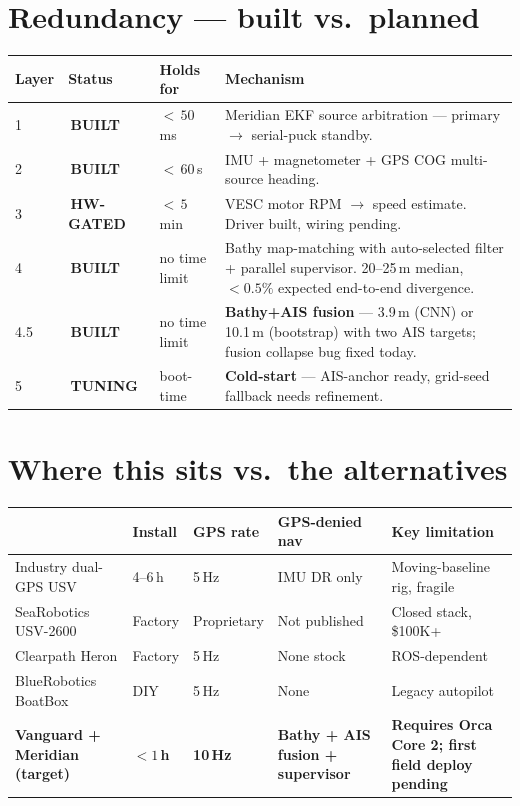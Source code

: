 \documentclass[10pt,a4paper]{article}
\newcommand{\statusbuilt}{{\color{white}\colorbox{mSafe}{\small\bfseries\,BUILT\,}}}
\newcommand{\statustuning}{{\color{white}\colorbox{mWarn}{\small\bfseries\,TUNING\,}}}
\newcommand{\statushardware}{{\color{white}\colorbox{mDim}{\small\bfseries\,HW-GATED\,}}}
\begin{document}
\pagebreak

\section{Redundancy — built vs.\ planned}
\begin{tabularx}{\textwidth}{@{}l l l X@{}}
\toprule
\textbf{Layer} & \textbf{Status} & \textbf{Holds for} & \textbf{Mechanism} \\
\midrule
\rowcolor{mRow} 1 & \statusbuilt & ${<}\,50$\,ms & Meridian EKF source arbitration — primary $\to$ serial-puck standby. \\
2 & \statusbuilt & ${<}\,60$\,s & IMU + magnetometer + GPS COG multi-source heading. \\
\rowcolor{mRow} 3 & \statushardware & ${<}\,5$\,min & VESC motor RPM $\to$ speed estimate. Driver built, wiring pending. \\
4 & \statusbuilt & no time limit & Bathy map-matching with auto-selected filter + parallel supervisor. 20--25\,m median, $<0.5\%$ expected end-to-end divergence. \\
\rowcolor{mRow} 4.5 & \statusbuilt & no time limit & \textbf{Bathy+AIS fusion} — 3.9\,m (CNN) or 10.1\,m (bootstrap) with two AIS targets; fusion collapse bug fixed today. \\
5 & \statustuning & boot-time & \textbf{Cold-start} — AIS-anchor ready, grid-seed fallback needs refinement. \\
\bottomrule
\end{tabularx}

\section{Where this sits vs.\ the alternatives}
\begin{tabularx}{\textwidth}{@{}L{38mm} l l l X@{}}
\toprule
\textbf{} & \textbf{Install} & \textbf{GPS rate} & \textbf{GPS-denied nav} & \textbf{Key limitation} \\
\midrule
{} Industry dual-GPS USV & 4--6\,h & 5\,Hz & IMU DR only & Moving-baseline rig, fragile \\
SeaRobotics USV-2600 & Factory & Proprietary & Not published & Closed stack, \$100K+ \\
 Clearpath Heron & Factory & 5\,Hz & None stock & ROS-dependent \\
BlueRobotics BoatBox & DIY & 5\,Hz & None & Legacy autopilot \\
\textbf{Vanguard + Meridian (target)} & \textbf{${<}1$\,h} & \textbf{10\,Hz} & \textbf{Bathy + AIS fusion + supervisor} & \textbf{Requires Orca Core 2; first field deploy pending} \\
\bottomrule
\end{tabularx}
\end{document}
